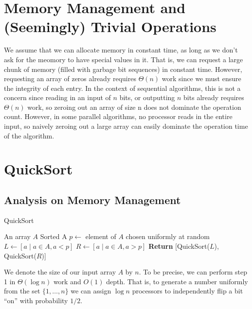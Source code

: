 \documentclass[11pt]{article}
\begin{document}
\section{Memory Management and (Seemingly) Trivial Operations}
\label{sec:org427dfe1}
We assume that we can allocate memory in constant time, as long as we don't ask for the meomory
to have special values in it.  That is, we can request a large chunk of memory (filled with
garbage bit sequences) in constant time. However, requesting an array of zeros already
requires \(\Theta(n)\) work since we must ensure the integrity of each entry. In the context of
sequential algorithms, this is not a concern since reading in an input of \(n\) bits, or
outputting \(n\) bits already requires \(\Theta(n)\) work, so zeroing out an array of size n does not
dominate the operation count. However, in some parallel algorithms, no processor reads in the
entire input, so naively zeroing out a large array can easily dominate the operation time of the
algorithm.
\section{QuickSort}
\label{sec:org5376f1d}
\subsection{Analysis on Memory Management}
\label{sec:org4ac3120}
\begin{algorithm}
\caption{QuickSort}
\begin{algorithmic}[1]
\Require An array \(A\)
\Ensure Sorted A
\State \(p\leftarrow\) element of \(A\) chosen uniformly at random
\State \(L\leftarrow[a\mid a\in A,a<p]\)
\State \(R\leftarrow[a\mid a\in A,a>p]\)
\State \textbf{Return} [QuickSort(\(L\)), QuickSort(\(R\))]
\end{algorithmic}
\end{algorithm}

We denote the size of our input array \(A\) by \(n\). To be precise, we can perform step 1
in \(\Theta(\log n)\) work and \(O(1)\) depth. That is, to generate a number uniformly from the
set \(\{1,\dots,n\}\) we can assign \(\log n\) processors to independently flip a bit ``on'' with
probability \(1/2\).
\end{document}
